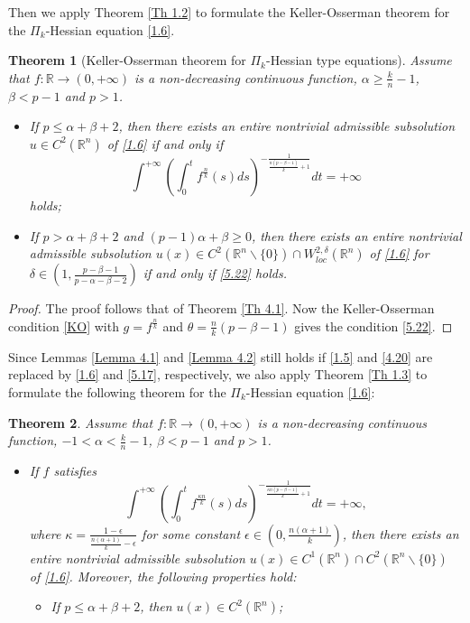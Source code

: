 \documentclass[a4paper,11pt]{amsart}
\theoremstyle{plain}
\newtheorem{Theorem}{Theorem}[section]
\theoremstyle{remark}
\numberwithin{equation}{section}
\numberwithin{figure}{section}
\numberwithin{remark}{section}
\begin{document}
\begin{sloppypar}
Then we apply Theorem \ref{Th 1.2} to formulate the Keller-Osserman theorem for the $\Pi_k$-Hessian equation \eqref{1.6}.
\begin{Theorem}[Keller-Osserman theorem for $\Pi_k$-Hessian type equations]\label{Th 5.1}
Assume that $f: \mathbb{R} \to (0,+\infty)$ is a non-decreasing continuous function, $\alpha\ge \frac{k}{n}-1$, $\beta<p-1$ and $p>1$. 
\begin{itemize}
\item[(i).] If $p\le \alpha+\beta +2$, then there exists an entire nontrivial admissible subsolution $u\in C^2(\mathbb{R}^n)$ of \eqref{1.6} if and only if 
\begin{equation}\label{5.22}
\int^{+\infty} \left (\int_0^t f^{\frac{n}{k}}(s) ds \right )^{-\frac{1}{\frac{n(p-\beta -1)}{k}+1}} dt= + \infty
\end{equation}
holds;
\item[(ii).] If $p>\alpha+\beta +2$ and $(p-1)\alpha +\beta \ge 0$, then there exists an entire nontrivial admissible subsolution $u(x)\in C^2(\mathbb{R}^n\backslash \{0\})\cap  W_{loc}^{2,\delta}(\mathbb{R}^n)$ of \eqref{1.6} for $\delta \in (1, \frac{p-\beta-1}{p-\alpha-\beta-2})$ if and only if \eqref{5.22} holds.
\end{itemize}
\end{Theorem}
\begin{proof}
The proof follows that of Theorem \ref{Th 4.1}. Now the Keller-Osserman condition \eqref{KO} with $g=f^{\frac{n}{k}}$ and $\theta=\frac{n}{k}(p-\beta -1)$ gives the condition \eqref{5.22}.
\end{proof}

Since Lemmas \ref{Lemma 4.1} and \ref{Lemma 4.2} still holds if \eqref{1.5} and \eqref{4.20} are replaced by \eqref{1.6} and \eqref{5.17}, respectively, we also apply Theorem \ref{Th 1.3} to formulate the following theorem for the $\Pi_k$-Hessian equation \eqref{1.6}:
\begin{Theorem}\label{Th 5.2}
Assume that $f: \mathbb{R} \to (0,+\infty)$ is a non-decreasing continuous function, $-1< \alpha < \frac{k}{n}-1$, $\beta<p-1$ and $p>1$. 
\begin{itemize}
\item[(a).] If $f$ satisfies 
	\begin{equation}\label{5.23}
	\int^{+\infty} \left ( \int_0^t f^{\frac{\kappa n}{k} }(s)ds \right )^{-\frac{1}{\frac{\kappa n(p-\beta -1)}{k}+1}} dt = + \infty,
	\end{equation}
where $\kappa =\frac{1-\epsilon}{\frac{n(\alpha+1)}{k} - \epsilon}$ for some constant $\epsilon\in (0, \frac{n(\alpha+1)}{k})$, then there exists an entire nontrivial admissible subsolution $u(x)\in C^1(\mathbb{R}^n)\cap C^2(\mathbb{R}^n\backslash \{0\})$ of \eqref{1.6}. Moreover, the following properties hold:
\begin{itemize}
\item[(i).] If $p\le \alpha +\beta +2$, then $u(x) \in C^2 (\mathbb{R}^n)$; 


\end{itemize}
\end{itemize}
\end{Theorem}
\end{sloppypar}
\end{document}
